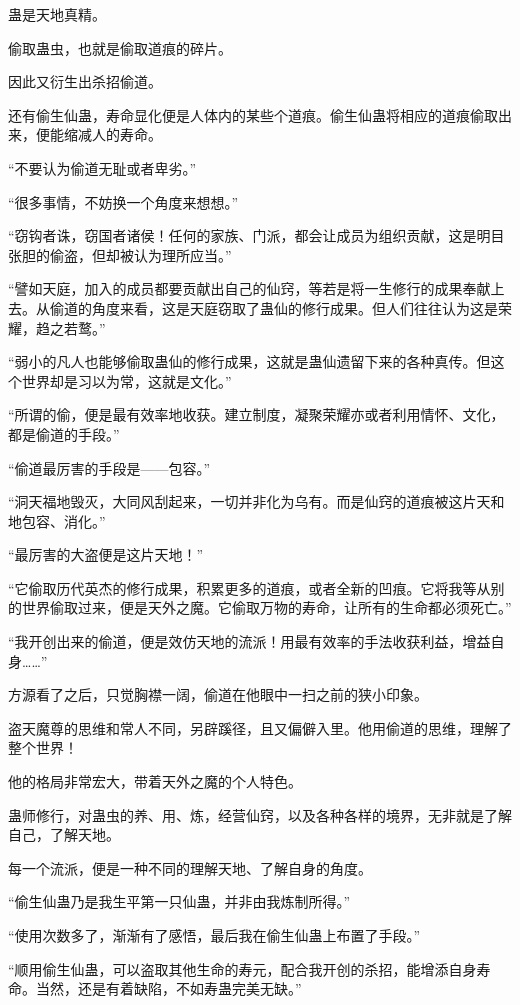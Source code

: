 \begin{this_body}
蛊是天地真精。

偷取蛊虫，也就是偷取道痕的碎片。

因此又衍生出杀招偷道。

还有偷生仙蛊，寿命显化便是人体内的某些个道痕。偷生仙蛊将相应的道痕偷取出来，便能缩减人的寿命。

“不要认为偷道无耻或者卑劣。”

“很多事情，不妨换一个角度来想想。”

“窃钩者诛，窃国者诸侯！任何的家族、门派，都会让成员为组织贡献，这是明目张胆的偷盗，但却被认为理所应当。”

“譬如天庭，加入的成员都要贡献出自己的仙窍，等若是将一生修行的成果奉献上去。从偷道的角度来看，这是天庭窃取了蛊仙的修行成果。但人们往往认为这是荣耀，趋之若鹜。”

“弱小的凡人也能够偷取蛊仙的修行成果，这就是蛊仙遗留下来的各种真传。但这个世界却是习以为常，这就是文化。”

“所谓的偷，便是最有效率地收获。建立制度，凝聚荣耀亦或者利用情怀、文化，都是偷道的手段。”

“偷道最厉害的手段是——包容。”

“洞天福地毁灭，大同风刮起来，一切并非化为乌有。而是仙窍的道痕被这片天和地包容、消化。”

“最厉害的大盗便是这片天地！”

“它偷取历代英杰的修行成果，积累更多的道痕，或者全新的凹痕。它将我等从别的世界偷取过来，便是天外之魔。它偷取万物的寿命，让所有的生命都必须死亡。”

“我开创出来的偷道，便是效仿天地的流派！用最有效率的手法收获利益，增益自身……”

方源看了之后，只觉胸襟一阔，偷道在他眼中一扫之前的狭小印象。

盗天魔尊的思维和常人不同，另辟蹊径，且又偏僻入里。他用偷道的思维，理解了整个世界！

他的格局非常宏大，带着天外之魔的个人特色。

蛊师修行，对蛊虫的养、用、炼，经营仙窍，以及各种各样的境界，无非就是了解自己，了解天地。

每一个流派，便是一种不同的理解天地、了解自身的角度。

“偷生仙蛊乃是我生平第一只仙蛊，并非由我炼制所得。”

“使用次数多了，渐渐有了感悟，最后我在偷生仙蛊上布置了手段。”

“顺用偷生仙蛊，可以盗取其他生命的寿元，配合我开创的杀招，能增添自身寿命。当然，还是有着缺陷，不如寿蛊完美无缺。”


\end{this_body}
